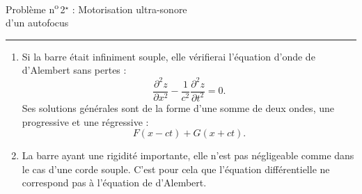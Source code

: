 \documentclass[a4paper]{article}
\begin{document}
	\begin{center}
		\LARGE\sc Problème n\textsuperscript o\,2$^\star$ : Motorisation ultra-sonore\\
		d’un autofocus
	\end{center}

	\begin{multicols}{2}
		\quad\hrule

		\begin{enumerate}[label=({\it\alph*\/})]
			\item Si la barre était infiniment souple, elle vérifierai l'équation d'onde de {\sc d'Alembert} sans pertes : \[
					\frac{\partial^2z}{\partial x^2} - \frac{1}{c^2} \frac{\partial^2 z}{\partial t^2} = 0
				.\]
				Ses solutions générales sont de la forme d'une somme de deux ondes, une progressive et une régressive : \[
					F(x - ct) + G(x + ct)
				.\]

			\item La barre ayant une rigidité importante, elle n'est pas négligeable comme dans le cas d'une corde souple. C'est pour cela que l'équation différentielle ne correspond pas à l'équation de {\sc d'Alembert}.


\end{enumerate}
\end{multicols}
\end{document}
